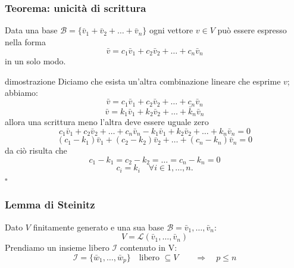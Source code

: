 \documentclass[x11names]{article}
\newcommand*{\QEDB}{\null\nobreak\hfill\ensuremath{\square}}%
\begin{document}
\begin{center}
	\colorbox{myred}{\begin{minipage}{5.75in}
			\begin{redes}{}
				\subsubsection{Teorema: unicità di scrittura}
				Data una base $\mathscr{B} = \{\bar{v}_1 + \bar{v}_2 + \dots + \bar{v}_{n}\}$ ogni vettore $v \in V$ può essere espresso nella forma
				\[
				\bar{v} = c_1\bar{v}_1 + c_2\bar{v}_2 + \dots + c_{n}\bar{v}_{n}
				\]
				in un solo modo.
			\end{redes}
	\end{minipage}}        
\end{center}



\begin{es}{dimostrazione}
Diciamo che esista un'altra combinazione lineare che esprime $v$; abbiamo:
\[
\bar{v} = c_1\bar{v}_1 + c_2\bar{v}_2 + \dots + c_{n}\bar{v}_{n}
\]
\[
\bar{v} = k_1\bar{v}_1 + k_2\bar{v}_2 + \dots + \bar{k}_{n}\bar{v}_{n}
\]
allora una scrittura meno l'altra deve essere uguale zero
\[
c_1\bar{v}_1 + c_2\bar{v}_2 + \dots + c_{n}\bar{v}_{n} - k_1\bar{v}_1 + k_2\bar{v}_2 + \dots + k_{n}\bar{v}_{n} = 0
\] 
\[
	\left(c_1-k_1\right)\bar{v}_1 + \left(c_2-k_2\right)\bar{v}_2 + \dots + \left(c_{n} - k_{n}\right)\bar{v}_{n} = 0
\] 
da ciò risulta che
\[
c_1 - k_1 = c_2 - k_2 = \dots = c_{n} -k_{n} = 0
\] 
\[
c_i = k_{i} \quad \forall i \in {1,\dots,n}
.\] \QEDB
\end{es}


\subsubsection{Lemma di Steinitz}
				Dato $V$ finitamente generato e una sua base $\mathcal{B} = {\bar{v}_{1},\dots,\bar{v}_{n}}$:
				\[
				V = \mathcal{L}(\bar{v}_{1},\dots,\bar{v}_{n}) 
				\]
				Prendiamo un insieme libero $\mathcal{I}$ contenuto in V:
				\[
				\mathcal{I} = \{\bar{w}_{1},\dots,\bar{w}_{p}\} \quad \text{libero } \subseteq V \quad  \quad \Longrightarrow \quad p \leq n
				\]
\end{document}
